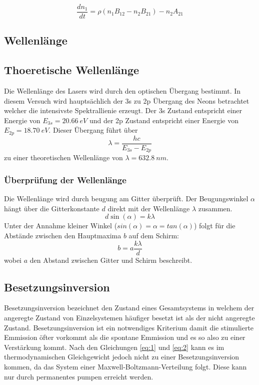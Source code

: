 \begin{equation}
    \label{eq:2}
    \frac{dn_1}{dt}=\rho(n_1B_{12}-n_2B_{21})-n_2A_{21}
\end{equation}

\subsection{Wellenlänge}
\label{sec:wellenlaenge}
\subsection{Thoeretische Wellenlänge}
Die Wellenlänge des Lasers wird durch den optischen Übergang bestimmt. In diesem Versuch wird 
hauptsächlich der 3s zu 2p Übergang des Neons betrachtet welcher die intensivste Spektrallienie 
erzeugt. Der 3s Zustand entspricht einer Energie von $E_{3s}=\SI[]{20.66}[]{eV}$ und der 2p
Zustand entspricht einer Energie von $E_{2p}=\SI[]{18.70}[]{eV}$. Dieser Übergang führt über
\begin{equation}
    \lambda=\frac{hc}{E_{3s}-E_{2p}}
\end{equation}
zu einer theoretischen Wellenlänge von $\lambda=\SI[]{632.8}[]{nm}$.
\subsubsection{Überprüfung der Wellenlänge}
Die Wellenlänge wird durch beugung am Gitter überprüft. Der Beugungswinkel $\alpha$ hängt
über die Gitterkonstante $d$ direkt mit der Wellenlänge $\lambda$ zusammen.
\begin{equation}
    d\sin(\alpha)=k\lambda
\end{equation}
Unter der Annahme kleiner Winkel ($sin(\alpha)=\alpha=tan(\alpha)$) folgt für die Abstände 
zwischen den Hauptmaxima $b$ auf dem Schirm:
\begin{equation}
    b=a\frac{k\lambda}{d}
\end{equation}
wobei $a$ den Abstand zwischen Gitter und Schirm beschreibt.

\subsection{Besetzungsinversion}
\label{sec:Besetzungsinversion}
Besetzungsinversion bezeichnet den Zustand eines Gesamtsystems in welchem der angeregte Zustand von 
Einzelsystemen häufiger besetzt ist als der nicht angeregte Zustand. Besetzungsinversion ist ein notwendiges
Kriterium damit die stimulierte Emmission öfter vorkommt als die spontane Emmission und es so also zu einer
Verstärkung kommt. Nach den Gleichungen \autoref{eq:1} und \autoref{eq:2} kann es im thermodynamischen
Gleichgewicht jedoch nicht zu einer Besetzungsinversion kommen, da das System einer Maxwell-Boltzmann-Verteilung 
folgt. Diese kann nur durch permanentes pumpen erreicht werden. 

